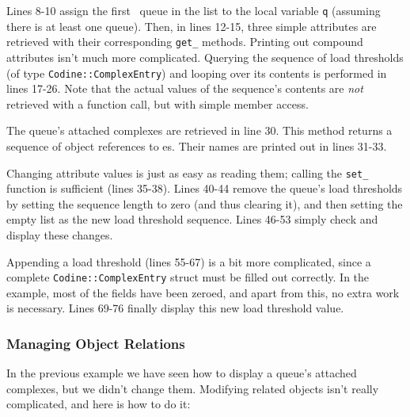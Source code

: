 Lines 8-10 assign the first \codine\ queue in the list to the local variable
\texttt{q} (assuming there is at least one queue). Then, in lines 12-15,
three simple attributes are retrieved with their corresponding \texttt{get\_}
methods. Printing out compound attributes isn't much more complicated.
Querying the sequence of load thresholds (of type
\texttt{Codine::ComplexEntry}) and looping over its contents is performed in
lines 17-26. Note that the actual values of the sequence's contents are
\emph{not} retrieved with a function call, but with simple member access.

The queue's attached complexes are retrieved in line 30. This method returns
a sequence of object references to \complex es. Their names are printed out
in lines 31-33.

Changing attribute values is just as easy as reading them; calling the
\texttt{set\_} function is sufficient (lines 35-38). Lines 40-44 remove the
queue's load thresholds by setting the sequence length to zero (and thus
clearing it), and then setting the empty list as the new load threshold
sequence. Lines 46-53 simply check and display these changes.

Appending a load threshold (lines 55-67) is a bit more complicated, since a
complete \texttt{Codine::ComplexEntry} struct must be filled out correctly.
In the example, most of the fields have been zeroed, and apart from this, no
extra work is necessary. Lines 69-76 finally display this new load 
threshold value.

\subsubsection{Managing Object Relations}
In the previous example we have seen how to display a queue's attached
complexes, but we didn't change them. Modifying related objects isn't really 
complicated, and here is how to do it:

